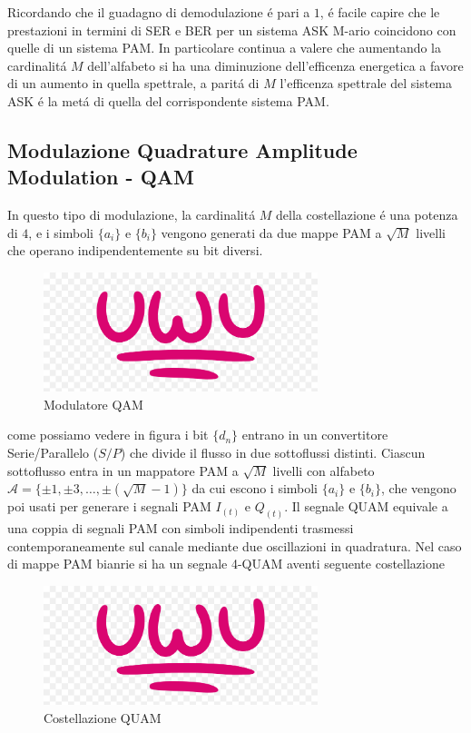         Ricordando che il guadagno di demodulazione é pari a $1$, é facile capire che le prestazioni in termini di SER e BER per un sistema ASK
        M-ario coincidono con quelle di un sistema PAM. In particolare continua a valere che aumentando la cardinalitá $M$ dell'alfabeto 
        si ha una diminuzione dell'efficenza energetica a favore di un aumento in quella spettrale, a paritá di $M$ l'efficenza 
        spettrale del sistema ASK é la metá di quella del corrispondente sistema PAM. 
    \subsection{Modulazione Quadrature Amplitude Modulation - QAM}
        In questo tipo di modulazione, la cardinalitá $M$ della costellazione é una potenza di $4$, e i simboli $\{a_i\}$ e $\{b_i\}$
        vengono generati da due mappe PAM a $\sqrt{M}$ livelli che operano indipendentemente su bit diversi.
        \begin{figure}[H]
            \centering
            \includegraphics*[width = 8cm]{media/uwu.png}
            \caption{Modulatore QAM}
        \end{figure}
        \begin{sloppypar}
            come possiamo vedere in figura i bit $\{d_n\}$ entrano in un convertitore Serie/Parallelo ($S/P$) che divide il flusso in 
            due sottoflussi distinti. Ciascun sottoflusso entra in un mappatore PAM a $\sqrt{M}$ livelli con alfabeto
            ${\mathcal{A} = \{\pm 1, \pm 3,\dots, \pm(\sqrt{M}-1)\}}$ da cui escono i simboli $\{a_i\}$ e $\{b_i\}$, che vengono poi usati per generare 
            i segnali PAM $I_{(t)}$ e $Q_{(t)}$. Il segnale QUAM equivale a una coppia di segnali PAM con simboli indipendenti trasmessi 
            contemporaneamente sul canale mediante due oscillazioni in quadratura. Nel caso di mappe PAM bianrie si ha un segnale 4-QUAM aventi
            seguente costellazione
        \end{sloppypar}
        \begin{figure}[H]
            \centering
            \includegraphics*[width = 8cm]{media/uwu.png}
            \caption{Costellazione QUAM}
        \end{figure}
